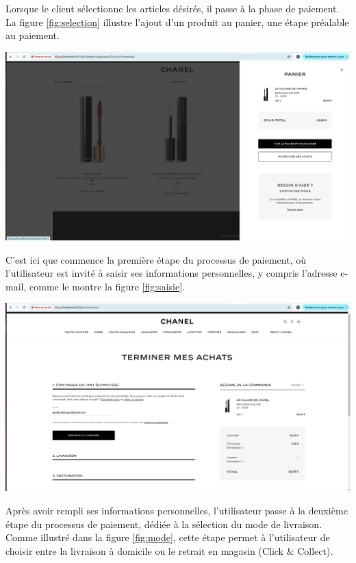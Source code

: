 Lorsque le client sélectionne les articles désirés, il passe à la phase de paiement. La figure \ref{fig:selection} illustre l'ajout d'un produit au panier, une étape préalable au paiement.
\begin{center}
    \centering
    \includegraphics[width=19cm]{Figures/Screens/ajouter un produit au panier.png}
    \label{fig:selection}
\end{center}
C'est ici que commence la première étape du processus de paiement, où l'utilisateur est invité à saisir ses informations personnelles, y compris l'adresse e-mail, comme le montre la figure \ref{fig:saisie}.
\begin{center}
    \centering
    \includegraphics[width=19cm]{Figures/Screens/ajout de l'email.png}
    \label{fig:saisie}
\end{center}
Après avoir rempli ses informations personnelles, l'utilisateur passe à la deuxième étape du processus de paiement, dédiée à la sélection du mode de livraison. Comme illustré dans la figure \ref{fig:mode}, cette étape permet à l'utilisateur de choisir entre la livraison à domicile ou le retrait en magasin (Click \& Collect). 
